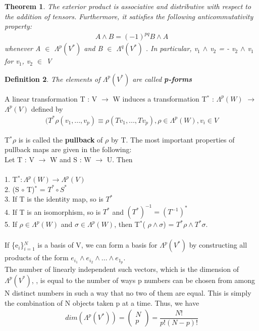 \documentclass[12pt,a4paper]{article}
\newtheorem{thm}{Theorem}
\newtheorem{defn}[thm]{Definition}
\begin{document}
\begin{thm}
The exterior product is associative and distributive
with respect to the addition of tensors. Furthermore, it satisfies the
following anticommutativity property:
\begin{eqnarray*}
A \wedge B = (-1)^{pq}B\wedge A
\end{eqnarray*}
whenever A $\in$ $\Lambda^{p} (V^*)$ and B $\in$ $\Lambda^{q} (V^*)$ .  In particular, v$_1$ $\wedge$ v$_2$ =
   - v$_2$ $\wedge$ v$_1$ for v$_1$, v$_2$ $\in$ V
\end{thm}
\begin{defn}
The elements of $\Lambda^{p} (V^*)$ are called \textbf{p-forms} 
\end{defn}
A linear transformation T : V $\to$ W induces a transformation T$^*$ : $\Lambda^{p} (W)$  $\to$ $\Lambda^{p} (V)$ defined by
\begin{eqnarray*}
(T^{*} \rho (v_1,...,v_p) \equiv \rho (T v_1,...,T v_p) , \rho \in \Lambda^{p}(W), v_i \in V
\end{eqnarray*}

T$^*\rho$ is is called the \textbf{pullback } of $\rho$ by T. The most important properties of
pullback maps are given in the following:\\
Let T : V $\to$ W and  S : W $\to$ U. Then\\
\\
1. T$^* : \Lambda^{p} (W) \to \Lambda^{p} (V)$\\
2. (S $\circ$ T)$^*$ = $T^* \circ S^*$\\
3. If T is the identity map, so is $T^*$\\
4. If T is an isomorphism, so is $T^*$ and $(T^*)^{-1} = (T^{-1})^*$\\
5. If $\rho \in \Lambda^{p} (W)$ and $\sigma \in \Lambda^{p} (W)$, then T$^*$( $\rho \wedge \sigma $) = $T^* \rho \wedge T^* \sigma$.
\\ \\
If \{e$_i$\}$^N_{i=1}$ is a basis of V, we can form a basis for $\Lambda^{p}(V^*)$ by constructing all products of the form $e_{i_1} \wedge e_{i_2} \wedge ... \wedge e_{1_p}$.  \\The number of linearly independent such vectors, which is the dimension of  $\Lambda^{p}(V^*)$,  , is equal to the number
of ways p numbers can be chosen from among N distinct numbers in such
a way that no two of them are equal. This is simply the combination of N
objects taken p at a time. Thus, we have \\
\begin{eqnarray*}
 dim (\Lambda^{p}(V^*)) =  \begin{pmatrix} N \\ p \end{pmatrix} = \dfrac{N!}{p!(N - p)!}
\end{eqnarray*}
\end{document}
